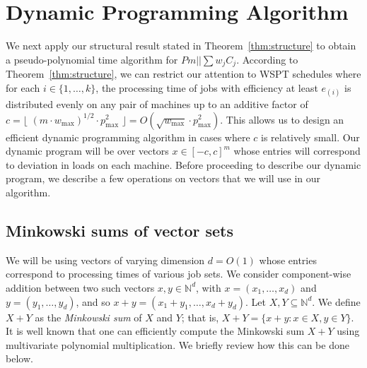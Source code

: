 \documentclass[11pt]{llncs}
\begin{document}
\section{Dynamic Programming Algorithm}

We next apply our structural result stated in Theorem~\ref{thm:structure} to obtain a pseudo-polynomial time algorithm for $Pm|| \sum w_jC_j$. According to Theorem~\ref{thm:structure}, we can restrict our attention to WSPT schedules where for each $i \in \{1,\ldots,k\}$, the processing time of jobs with efficiency at least $e_{(i)}$ is distributed evenly on any pair of machines up to an additive factor of~$c = \lfloor\,\, (m \cdot w_{\max})^{1/2} \cdot p_{\max}^2 \,\,\rfloor = O(\sqrt{w_{\max}} \cdot p^2_{\max})$. This allows us to design an efficient dynamic programming algorithm in cases where $c$ is relatively small.
\main*
\noindent Our dynamic program will be over vectors $x \in [-c, c]^m$ whose entries will correspond to deviation in loads on each machine. Before proceeding to describe our dynamic program, we describe a few operations on vectors that we will use in our algorithm. 




\subsection{Minkowski sums of vector sets}

We will be using vectors of varying dimension $d = O(1)$ whose entries correspond to processing times of various job sets. We consider component-wise addition between two such vectors $x,y \in \mathbb{N}^d$, with $x=(x_1,\ldots,x_d)$ and $y=(y_1,\ldots,y_d)$, and so $x+y=(x_1+y_1,\ldots,x_d+y_d)$. Let $X,Y \subseteq \mathbb{N}^d$. We define $X+Y$ as the \emph{Minkowski sum} of $X$ and $Y$; that is, $X + Y = \{x+y : x \in X, y \in Y\}$. It is well known that one can efficiently compute the Minkowski sum $X+Y$ using multivariate polynomial multiplication. We briefly review how this can be done below. 
\end{document}
